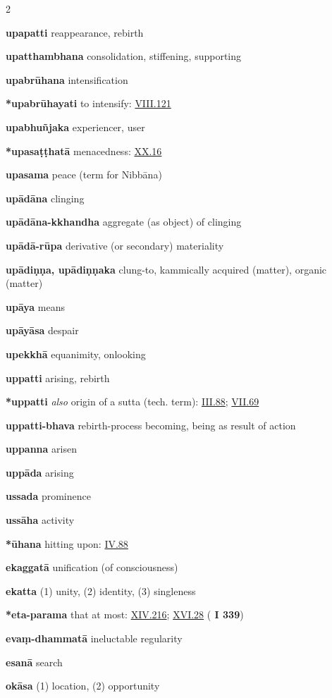 \begin{multicols}{2}
\begin{vismHanging}
\par\textbf{upapatti} reappearance, rebirth
\par\textbf{upatthambhana} consolidation, stiffening, supporting 
\par\textbf{upabrūhana} intensification
\par\textbf{*upabrūhayati} to intensify: \hyperlink{VIII.121}{VIII.121}{}
\par\textbf{upabhuñjaka} experiencer, user
\par\textbf{*upasaṭṭhatā} menacedness: \hyperlink{XX.16}{XX.16}{}
\par\textbf{upasama} peace (term for Nibbāna)
\par\textbf{upādāna} clinging
\par\textbf{upādāna-kkhandha} aggregate (as object) of clinging 
\par\textbf{upādā-rūpa} derivative (or secondary) materiality 
\par\textbf{upādiṇṇa, upādiṇṇaka} clung-to, kammically acquired (matter), organic (matter) 
\par\textbf{upāya} means
\par\textbf{upāyāsa} despair
\par\textbf{upekkhā} equanimity, onlooking
\par\textbf{uppatti} arising, rebirth
\par\textbf{*uppatti} \emph{also }origin of a sutta (tech. term): \hyperlink{III.88}{III.88}{}; \hyperlink{VII.69}{VII.69}{} 
\par\textbf{uppatti-bhava} rebirth-process becoming, being as result of action 
\par\textbf{uppanna} arisen
\par\textbf{uppāda} arising
\par\textbf{ussada} prominence
\par\textbf{ussāha} activity
\par\textbf{*ūhana} hitting upon: \hyperlink{IV.88}{IV.88}{}
\par\textbf{ekaggatā} unification (of consciousness)
\par\textbf{ekatta} (1) unity, (2) identity, (3) singleness 
\par\textbf{*eta-parama} that at most: \hyperlink{XIV.216}{XIV.216}{}; \hyperlink{XVI.28}{XVI.28}{} (\textbf{\cite{M} I 339}) 
\par\textbf{evaṃ-dhammatā} ineluctable regularity 
\par\textbf{esanā} search 
\par\textbf{okāsa} (1) location, (2) opportunity

\end{vismHanging}
\end{multicols}
